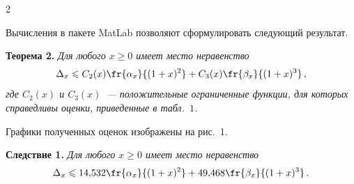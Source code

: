 \begin{multicols}{2}
\smallskip

Вычисления в пакете MatLab позволяют сформулировать следующий результат.

\medskip

\noindent
\textbf{Теорема 2.} \textit{Для любого $x\geqslant 0$ имеет место неравенство
$$
\Delta_x\leqslant
C_2(x)\fr{\alpha_x}{(1+x)^2}+C_3(x)\fr{\beta_x}{(1+x)^3}\,,
$$
где $C_2(x)$ и $C_3(x)$~--- положительные ограниченные функции, для
которых справедливы оценки, приведенные в табл.~$1$.
}

\smallskip

Графики полученных оценок изображены на рис.~1.



\medskip

\noindent
\textbf{Следствие 1.} \textit{Для любого $x\geqslant0$ имеет место неравенство}
$$
\Delta_x\leqslant
14{,}532\fr{\alpha_x}{(1+x)^2}+49{,}468\fr{\beta_x}{(1+x)^3}\,.
$$

\end{multicols}

